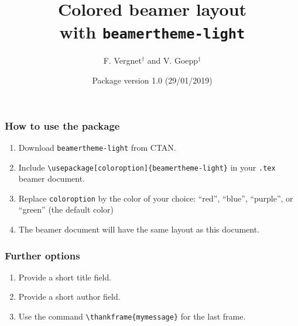 \documentclass[10pt, compress]{beamer}
\title[The package \texttt{light}]{Colored beamer layout \\ with \texttt{beamertheme-light}}
\author[F. Vergnet and V. Goepp]{F. Vergnet$^\dagger$ and V. Goepp$^{\ddagger}$}
\institute{$\dagger$ : LMO, Universit\'e Paris-Sud, Universit\'e Paris-Saclay,  \\ $\ddagger$ : MAP5, Universit\'e Paris-Descartes}
\date{Package version 1.0 (29/01/2019)}
\begin{document}
{
\begin{frame}
	\titlepage
\end{frame}
}

\begin{frame}
	\frametitle{How to use the package}
	\begin{enumerate}
	\item Download \texttt{beamertheme-light} from CTAN.
	\item Include \texttt{\textbackslash usepackage[coloroption]\{beamertheme-light\}} in your \texttt{.tex} beamer document.
	\item Replace \texttt{coloroption} by the color of your choice: ``red'', ``blue'', ``purple'', or ``green'' (the default color)
	\item The beamer document will have the same layout as this document.
	\end{enumerate}
\end{frame}

\begin{frame}
		\frametitle{Further options}
		\begin{enumerate}
				\item Provide a short title field.
				\item Provide a short author field.
				\item Use the command \texttt{\textbackslash thankframe\{mymessage\}} for the last frame.
		\end{enumerate}
\end{frame}
	
\end{document}
